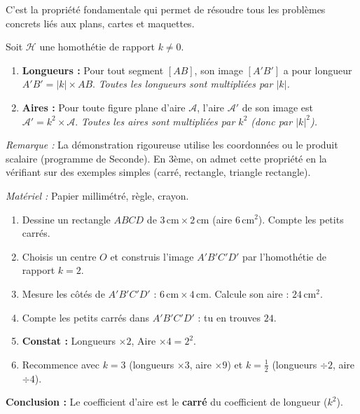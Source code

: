 \documentclass[11pt]{article}
\begin{document}
C'est la propriété fondamentale qui permet de résoudre tous les problèmes concrets liés aux plans, cartes et maquettes.

\begin{propriete}
Soit $\mathcal{H}$ une homothétie de rapport $k \neq 0$.
\begin{enumerate}
    \item \textbf{Longueurs :} Pour tout segment $[AB]$, son image $[A'B']$ a pour longueur $A'B' = |k| \times AB$. \emph{Toutes les longueurs sont multipliées par $|k|$.}
    \item \textbf{Aires :} Pour toute figure plane d'aire $\mathcal{A}$, l'aire $\mathcal{A}'$ de son image est $\mathcal{A}' = k^2 \times \mathcal{A}$. \emph{Toutes les aires sont multipliées par $k^2$ (donc par $|k|^2$).}
\end{enumerate}
\emph{Remarque :} La démonstration rigoureuse utilise les coordonnées ou le produit scalaire (programme de Seconde). En 3ème, on admet cette propriété en la vérifiant sur des exemples simples (carré, rectangle, triangle rectangle).
\end{propriete}

\begin{experience}
\emph{Matériel :} Papier millimétré, règle, crayon.
\begin{enumerate}
    \item Dessine un rectangle $ABCD$ de $3\,\text{cm} \times 2\,\text{cm}$ (aire $6\,\text{cm}^2$). Compte les petits carrés.
    \item Choisis un centre $O$ et construis l'image $A'B'C'D'$ par l'homothétie de rapport $k=2$.
    \item Mesure les côtés de $A'B'C'D'$ : $6\,\text{cm} \times 4\,\text{cm}$. Calcule son aire : $24\,\text{cm}^2$.
    \item Compte les petits carrés dans $A'B'C'D'$ : tu en trouves $24$.
    \item \textbf{Constat :} Longueurs $\times 2$, Aire $\times 4 = 2^2$.
    \item Recommence avec $k=3$ (longueurs $\times 3$, aire $\times 9$) et $k=\frac{1}{2}$ (longueurs $\div 2$, aire $\div 4$).
\end{enumerate}
\textbf{Conclusion :} Le coefficient d'aire est le \textbf{carré} du coefficient de longueur ($k^2$).
\end{experience}
\end{document}
